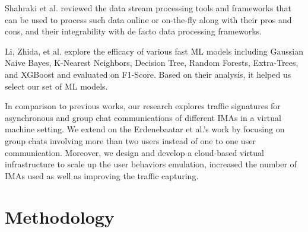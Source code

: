 \documentclass[conference]{IEEEtran}
\begin{document}
Shahraki et al. \cite{b9} reviewed the data stream processing tools and frameworks that can be used to process such data online or on-the-fly along with their pros and cons, and their integrability with de facto data processing frameworks. 

Li, Zhida, et al. \cite{b16} explore the efficacy of various fast ML models including Gaussian Naive Bayes, K-Nearest Neighbors, Decision Tree, Random Forests, Extra-Trees, and XGBoost and evaluated on F1-Score. Based on their analysis, it helped us select our set of ML models.

In comparison to previous works, our research explores traffic signatures for asynchronous and group chat communications of different IMAs in a virtual machine setting. We extend on the  Erdenebaatar et al.'s work \cite{b1} by focusing on group chats involving more than two users instead of one to one user communication. Moreover, we design and develop a cloud-based virtual infrastructure to scale up the user behaviors emulation, increased the number of IMAs used as well as improving the traffic capturing. 



\section{Methodology}
\end{document}
